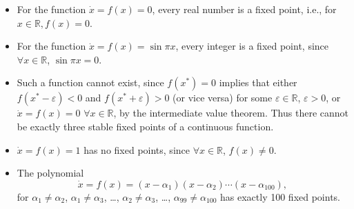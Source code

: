 \begin{itemize}
  \item[(a)] For the function $\dot{x} = f(x) = 0$, every real number is a fixed
    point, i.e., for $x \in \mathbb{R}, f(x) = 0$.
  \item[(b)] For the function $\dot{x} = f(x) = \sin{\pi x}$, every integer
    is a fixed point, since $\forall x \in \mathbb{R}$, $\sin{\pi x} = 0$.
  \item[(c)] Such a function cannot exist, since $f(x^*) = 0$ implies
    that either
    $f(x^* - \varepsilon) < 0$ and $f(x^* + \varepsilon) > 0$ (or vice versa)
    for some $\varepsilon \in \mathbb{R}$, $\varepsilon > 0$, or
    $\dot{x} = f(x) = 0$ $\forall x \in \mathbb{R}$, by the intermediate value
    theorem. Thus there cannot be exactly three stable fixed points of a
    continuous function.
  \item[(d)] $\dot{x} = f(x) = 1$ has no fixed points, since
    $\forall x \in \mathbb{R}$, $f(x) \neq 0$.
  \item[(e)] The polynomial
    \[
      \dot{x} = f(x) = (x - \alpha_1)(x - \alpha_2) \cdots (x - \alpha_{100}),
    \]
    for $\alpha_1 \neq \alpha_2$, $\alpha_1 \neq \alpha_3$, \ldots,
    $\alpha_2 \neq \alpha_3$, \ldots, $\alpha_{99} \neq \alpha_{100}$
    has exactly
    100 fixed points.
\end{itemize}
